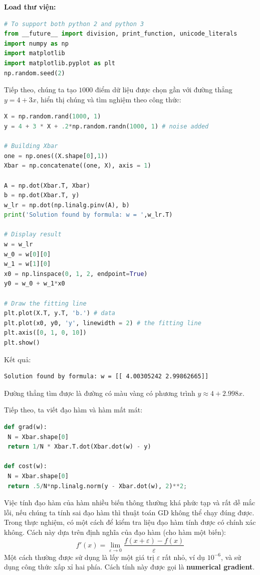 \begin{vidu}[title={Load thư viện và tạo dữ liệu}]
\textbf{Load thư viện:}
\begin{lstlisting}[language=Python]
# To support both python 2 and python 3
from __future__ import division, print_function, unicode_literals
import numpy as np
import matplotlib
import matplotlib.pyplot as plt
np.random.seed(2)
\end{lstlisting}

Tiếp theo, chúng ta tạo $1000$ điểm dữ liệu được chọn gần với đường thẳng $y = 4 + 3x$, hiển thị chúng và tìm nghiệm theo công thức:
\begin{lstlisting}[language=Python]
X = np.random.rand(1000, 1)
y = 4 + 3 * X + .2*np.random.randn(1000, 1) # noise added

# Building Xbar
one = np.ones((X.shape[0],1))
Xbar = np.concatenate((one, X), axis = 1)

A = np.dot(Xbar.T, Xbar)
b = np.dot(Xbar.T, y)
w_lr = np.dot(np.linalg.pinv(A), b)
print('Solution found by formula: w = ',w_lr.T)

# Display result
w = w_lr
w_0 = w[0][0]
w_1 = w[1][0]
x0 = np.linspace(0, 1, 2, endpoint=True)
y0 = w_0 + w_1*x0

# Draw the fitting line
plt.plot(X.T, y.T, 'b.') # data
plt.plot(x0, y0, 'y', linewidth = 2) # the fitting line
plt.axis([0, 1, 0, 10])
plt.show()
\end{lstlisting}

Kết quả:
\begin{lstlisting}
Solution found by formula: w = [[ 4.00305242 2.99862665]]
\end{lstlisting}


Đường thẳng tìm được là đường có màu vàng có phương trình $y \approx 4 + 2.998x$.

Tiếp theo, ta viết đạo hàm và hàm mất mát:
\begin{lstlisting}[language=Python]
def grad(w):
 N = Xbar.shape[0]
 return 1/N * Xbar.T.dot(Xbar.dot(w) - y)

def cost(w):
 N = Xbar.shape[0]
 return .5/N*np.linalg.norm(y - Xbar.dot(w), 2)**2;
\end{lstlisting}
\end{vidu}

\begin{dinhnghia}[title={Kiểm tra đạo hàm: Numerical gradient}]
Việc tính đạo hàm của hàm nhiều biến thông thường khá phức tạp và rất dễ mắc lỗi, nếu chúng ta tính sai đạo hàm thì thuật toán GD không thể chạy đúng được. Trong thực nghiệm, có một cách để kiểm tra liệu đạo hàm tính được có chính xác không. Cách này dựa trên định nghĩa của đạo hàm (cho hàm một biến):
\[
f'(x) = \lim_{\varepsilon \rightarrow 0}\frac{f(x + \varepsilon) - f(x)}{\varepsilon}
\]
Một cách thường được sử dụng là lấy một giá trị $\varepsilon$ rất nhỏ, ví dụ $10^{-6}$, và sử dụng công thức xấp xỉ hai phía. Cách tính này được gọi là \textbf{numerical gradient}.
\end{dinhnghia}

